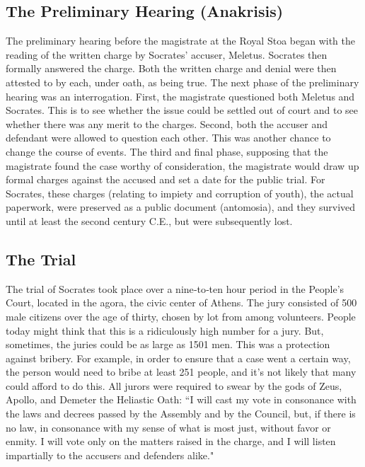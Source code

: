 \subsection{The Preliminary Hearing (Anakrisis)}

The preliminary hearing before the magistrate at the Royal Stoa began with the reading of the written charge by Socrates' accuser, Meletus. Socrates then formally answered the charge. Both the written charge and denial were then attested to by each, under oath, as being true. The next phase of the preliminary hearing was an interrogation. First, the magistrate questioned both Meletus and Socrates. This is to see whether the issue could be settled out of court and to see whether there was any merit to the charges. Second, both the accuser and defendant were allowed to question each other. This was another chance to change the course of events. The third and final phase, supposing that the magistrate found the case worthy of consideration, the magistrate would draw up formal charges against the accused and set a date for the public trial. For Socrates, these charges (relating to impiety and corruption of youth), the actual paperwork, were preserved as a public document (antomosia), and they survived until at least the second century C.E., but were subsequently lost. 
\subsection{The Trial}

The trial of Socrates took place over a nine‐to‐ten hour period in the People's Court, located in the agora, the civic center of Athens. The jury consisted of 500 male citizens over the age of thirty, chosen by lot from among volunteers. People today might think that this is a ridiculously high number for a jury.  But, sometimes, the juries could be as large as 1501 men. This was a protection against bribery. For example, in order to ensure that a case went a certain way, the person would need to bribe at least 251 people, and it's not likely that many could afford to do this.  All jurors were required to swear by the gods of Zeus, Apollo, and Demeter the Heliastic Oath: ``I will cast my vote in consonance with the laws and decrees passed by the Assembly and by the Council, but, if there is no law, in consonance with my sense of what is most just, without favor or enmity. I will vote only on the matters raised in the charge, and I will listen impartially to the accusers and defenders alike."

